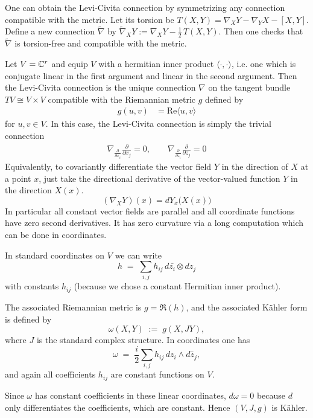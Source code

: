 \documentclass[12pt]{article}
\begin{document}
One can obtain the Levi-Civita connection by symmetrizing any connection compatible with the metric. Let its torsion be
$T(X,Y) = \nabla_X Y - \nabla_Y X - [X,Y]$. Define a new connection $\widetilde\nabla$ by $\widetilde\nabla_X Y := \nabla_X Y - \frac12\,T(X,Y)$. Then one checks that $\widetilde\nabla$ is torsion-free and compatible with the metric.

\begin{example}
    Let $V = \mathbb{C}^r$ and equip $V$ with a hermitian inner product $\langle \cdot, \cdot \rangle$, i.e. one which is conjugate linear in the first argument and linear in the second argument. Then the Levi-Civita connection is the unique connection $\nabla$ on the tangent bundle $TV \cong V \times V$ compatible with the Riemannian metric $g$ defined by \begin{align*}
        g(u,v) & = \mathrm{Re} \langle u, v \rangle
    \end{align*} for $u,v \in V$. In this case, the Levi-Civita connection is simply the trivial connection \begin{align*}
        \nabla_{\frac{\partial}{\partial x_i}} \frac{\partial}{\partial x_j} = 0,\qquad
\nabla_{\frac{\partial}{\partial z_i}} \frac{\partial}{\partial z_j} = 0
    \end{align*} 
    Equivalently, to covariantly differentiate the vector field $Y$ in the direction of $X$ at a point $x$, just take the directional derivative of the vector-valued function $Y$ in the direction $X(x)$. \[(\nabla_X Y)(x) = dY_x\big(X(x)\big)\]
In particular all constant vector fields are parallel and all coordinate functions have zero second derivatives. It has zero curvature via a long computation which can be done in coordinates.

In standard coordinates on $V$ we can write
\[
h \;=\; \sum_{i,j} h_{i j}\,d \bar{z_i} \otimes d z_j
\]
with constants $h_{ij}$ (because we chose a constant Hermitian inner product).

The associated Riemannian metric is $g=\Re(h)$, and the associated Kähler form is defined by
\[
\omega(X,Y)\;:=\; g(X,JY),
\]
where $J$ is the standard complex structure. In coordinates one has
\[
\omega \;=\; \frac{i}{2}\sum_{i,j} h_{i j}\,dz_i\wedge d\bar z_j,
\]
and again all coefficients $h_{i j}$ are constant functions on $V$.

Since $\omega$ has constant coefficients in these linear coordinates, $d\omega=0$ because $d$ only differentiates the coefficients, which are constant. Hence $(V,J,g)$ is Kähler.
\end{example}
\end{document}
